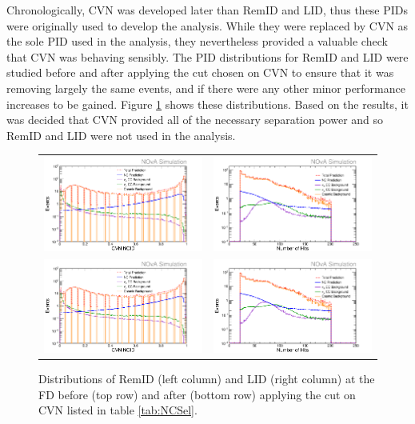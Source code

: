 Chronologically, CVN was developed later than RemID and LID, thus these PIDs were originally used to develop the analysis. While they were replaced by CVN as the sole PID used in the analysis, they nevertheless provided a valuable check that CVN was behaving sensibly. The PID distributions for RemID and LID were studied before and after applying the cut chosen on CVN to ensure that it was removing largely the same events, and if there were any other minor performance increases to be gained. Figure \ref{fig:NCSelRemLID} shows these distributions. Based on the results, it was decided that CVN provided all of the necessary separation power and so RemID and LID were not used in the analysis.
\begin{figure}[htb]
  \centering
  \begin{tabular}{c c}
    \includegraphics[width=.47\textwidth]{figures/NP1CVNC.png} &
    \includegraphics[width=.47\textwidth]{figures/NP1NHit.png} \\
    \includegraphics[width=.47\textwidth]{figures/NP1CVNC.png} &
    \includegraphics[width=.47\textwidth]{figures/NP1NHit.png} \\
  \end{tabular}
  \caption[RemID and LID Distributions]{Distributions of RemID (left column) and LID (right column) at the FD before (top row) and after (bottom row) applying the cut on CVN listed in table \ref{tab:NCSel}.}
  \label{fig:NCSelRemLID}
\end{figure}

